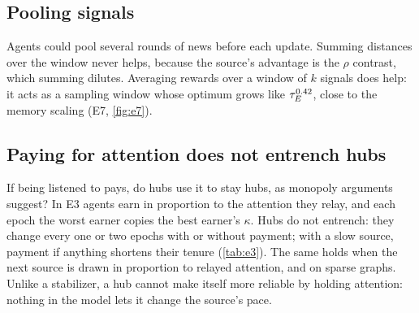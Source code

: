 
\begin{table}[tbp]\centering\small\caption{E4: self-consistent memories.}\label{tab:e4}\end{table}

\subsection{Pooling signals}
Agents could pool several rounds of news before each update. Summing distances over the window never helps, because
the source's advantage is the $\rho$ contrast, which summing dilutes. Averaging rewards over a window of $k$ signals does
help: it acts as a sampling window whose optimum grows like $\tau_E^{0.42}$, close to the memory scaling (E7,
\cref{fig:e7}).


\subsection{Paying for attention does not entrench hubs}
If being listened to pays, do hubs use it to stay hubs, as monopoly arguments suggest? In E3 agents earn in proportion to
the attention they relay, and each epoch the worst earner copies the best earner's $\kappa$. Hubs do not entrench: they
change every one or two epochs with or without payment; with a slow source, payment if anything shortens their tenure
(\cref{tab:e3}). The same holds when the next source is drawn in proportion to relayed attention, and on sparse graphs.
Unlike a stabilizer, a hub cannot make itself more reliable by holding attention: nothing in the model lets it change the
source's pace.

\begin{table}[tbp]\centering\small\caption{E3: hub tenure and takeovers over 150 epochs.}\label{tab:e3}\end{table}
